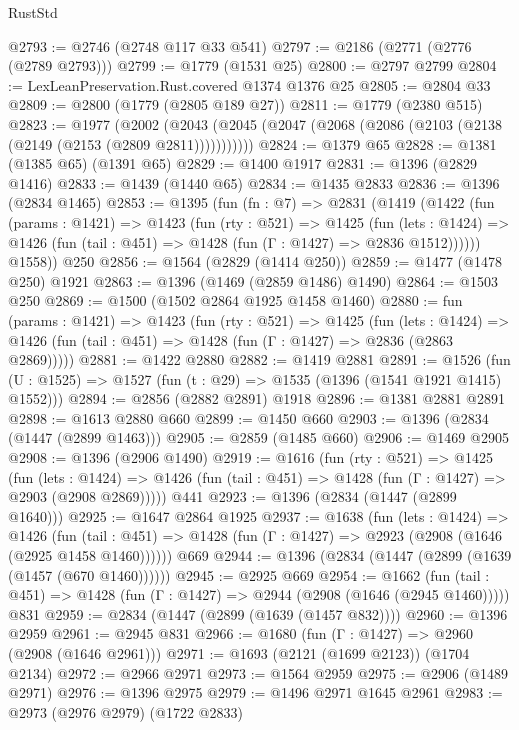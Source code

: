 \begin{lexlean}{RustStd}
\begin{coremodule}
@2793 := @2746 (@2748 @117 @33 @541)
@2797 := @2186 (@2771 (@2776 (@2789 @2793)))
@2799 := @1779 (@1531 @25)
@2800 := @2797 @2799
@2804 := LexLeanPreservation.Rust.covered @1374 @1376 @25
@2805 := @2804 @33
@2809 := @2800 (@1779 (@2805 @189 @27))
@2811 := @1779 (@2380 @515)
@2823 := @1977
    (@2002 (@2043 (@2045 (@2047 (@2068 (@2086 (@2103 (@2138 (@2149 (@2153 (@2809 @2811)))))))))))
@2824 := @1379 @65
@2828 := @1381 (@1385 @65) (@1391 @65)
@2829 := @1400 @1917
@2831 := @1396 (@2829 @1416)
@2833 := @1439 (@1440 @65)
@2834 := @1435 @2833
@2836 := @1396 (@2834 @1465)
@2853 := @1395
    (fun (fn : @7) =>
    @2831
      (@1419
        (@1422
          (fun (params : @1421) =>
          @1423
            (fun (rty : @521) =>
            @1425
              (fun (lets : @1424) =>
              @1426 (fun (tail : @451) => @1428 (fun (Γ : @1427) => @2836 @1512))))))
        @1558))
    @250
@2856 := @1564 (@2829 (@1414 @250))
@2859 := @1477 (@1478 @250) @1921
@2863 := @1396 (@1469 (@2859 @1486) @1490)
@2864 := @1503 @250
@2869 := @1500 (@1502 @2864 @1925 @1458 @1460)
@2880 := fun (params : @1421) =>
  @1423
    (fun (rty : @521) =>
    @1425
      (fun (lets : @1424) =>
      @1426 (fun (tail : @451) => @1428 (fun (Γ : @1427) => @2836 (@2863 @2869)))))
@2881 := @1422 @2880
@2882 := @1419 @2881
@2891 := @1526 (fun (U : @1525) => @1527 (fun (t : @29) => @1535 (@1396 (@1541 @1921 @1415) @1552)))
@2894 := @2856 (@2882 @2891) @1918
@2896 := @1381 @2881 @2891
@2898 := @1613 @2880 @660
@2899 := @1450 @660
@2903 := @1396 (@2834 (@1447 (@2899 @1463)))
@2905 := @2859 (@1485 @660)
@2906 := @1469 @2905
@2908 := @1396 (@2906 @1490)
@2919 := @1616
    (fun (rty : @521) =>
    @1425
      (fun (lets : @1424) =>
      @1426 (fun (tail : @451) => @1428 (fun (Γ : @1427) => @2903 (@2908 @2869)))))
    @441
@2923 := @1396 (@2834 (@1447 (@2899 @1640)))
@2925 := @1647 @2864 @1925
@2937 := @1638
    (fun (lets : @1424) =>
    @1426
      (fun (tail : @451) => @1428 (fun (Γ : @1427) => @2923 (@2908 (@1646 (@2925 @1458 @1460))))))
    @669
@2944 := @1396 (@2834 (@1447 (@2899 (@1639 (@1457 (@670 @1460))))))
@2945 := @2925 @669
@2954 := @1662
    (fun (tail : @451) => @1428 (fun (Γ : @1427) => @2944 (@2908 (@1646 (@2945 @1460)))))
    @831
@2959 := @2834 (@1447 (@2899 (@1639 (@1457 @832))))
@2960 := @1396 @2959
@2961 := @2945 @831
@2966 := @1680 (fun (Γ : @1427) => @2960 (@2908 (@1646 @2961)))
@2971 := @1693 (@2121 (@1699 @2123)) (@1704 @2134)
@2972 := @2966 @2971
@2973 := @1564 @2959
@2975 := @2906 (@1489 @2971)
@2976 := @1396 @2975
@2979 := @1496 @2971 @1645 @2961
@2983 := @2973 (@2976 @2979) (@1722 @2833)

\end{coremodule}
\end{lexlean}
